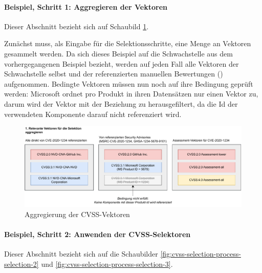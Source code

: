 \paragraph{Beispiel, Schritt 1: Aggregieren der Vektoren} \label{par:projektbericht-loesungsweg-cvss-selection-example-step-1}

Dieser Abschnitt bezieht sich auf Schaubild \ref{fig:cvss-selection-process-selection-1}.

Zunächst muss, als Eingabe für die Selektionsschritte, eine Menge an Vektoren gesammelt werden.
Da sich dieses Beispiel auf die Schwachstelle  aus dem vorhergegangenen Beispiel bezieht, werden auf jeden Fall alle Vektoren der Schwachstelle selbst und der referenzierten manuellen Bewertungen () aufgenommen.
Bedingte Vektoren müssen nun noch auf ihre Bedingung geprüft werden:
Microsoft ordnet pro Produkt in ihren Datensätzen nur einen Vektor zu, darum wird der Vektor mit der Beziehung zu  herausgefiltert, da die Id der verwendeten Komponente  darauf nicht referenziert wird.

\begin{figure}[htbp] %
    \centering
    \includegraphics[width=1\textwidth, keepaspectratio]{res/grafiken/cvss-selection-process-selection-1}
    \caption{Aggregierung der CVSS-Vektoren}
    \label{fig:cvss-selection-process-selection-1}
\end{figure}

\paragraph{Beispiel, Schritt 2: Anwenden der CVSS-Selektoren} \label{par:projektbericht-loesungsweg-cvss-selection-example-step-2}

Dieser Abschnitt bezieht sich auf die Schaubilder \ref{fig:cvss-selection-process-selection-2} und \ref{fig:cvss-selection-process-selection-3}.

